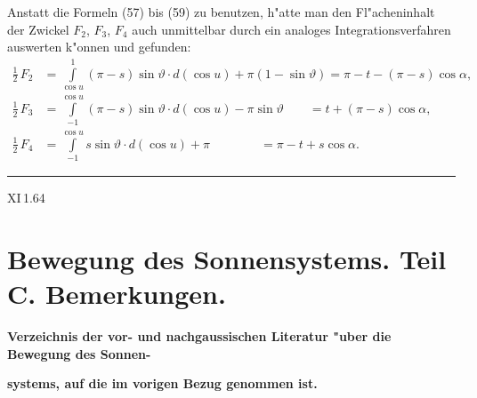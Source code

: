\documentclass[12pt,a4paper]{article}
\theoremstyle{plain}
\theoremstyle{definition}
\theoremstyle{remark}
\begin{document}
Anstatt die Formeln (57) bis (59) zu benutzen, h"atte man den Fl"acheninhalt der Zwickel $F_2$, $F_3$, $F_4$
auch unmittelbar durch ein analoges Integrationsverfahren auswerten k"onnen und gefunden:
\begin{align}\tag{60}
\tfrac{1}{2}\,F_2 &= \int\limits_{\cos u}^{1} (\pi - s) \sin \vartheta \cdot d(\cos u) + \pi(1 - \sin \vartheta) = \pi - t - (\pi - s) \cos \alpha,\\ \tag{61}
\tfrac{1}{2}\,F_3 &= \int\limits_{-1}^{\cos u} (\pi - s) \sin \vartheta \cdot d(\cos u) - \pi \sin \vartheta \qquad = t + (\pi - s) \cos \alpha,\\ \tag{62}
\tfrac{1}{2}\,F_4 &= \int\limits_{-1}^{\cos u} s \sin \vartheta \cdot d(\cos u) + \pi \qquad\qquad = \pi - t + s \cos \alpha.
\end{align}

\vspace{1em}
\hrule
\vspace{1em}

\begin{flushright}
\textsc{XI}\,1.\hspace{3em}64
\end{flushright}

\newpage
\section*{Bewegung des Sonnensystems. Teil C. Bemerkungen.}

\textbf{Verzeichnis der vor- und nachgaussischen Literatur "uber die Bewegung des Sonnen-}

\textbf{systems, auf die im vorigen Bezug genommen ist.}
\end{document}
